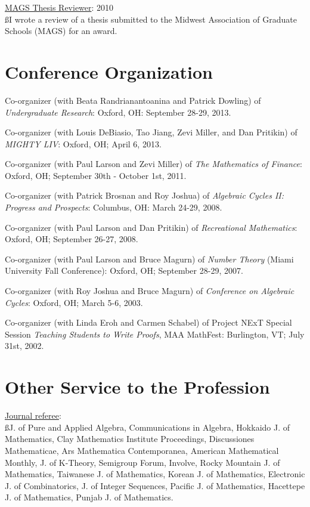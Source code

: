 \documentclass[overlapped,line,letterpaper]{res}
\begin{document}
\begin{resume}
\underline{MAGS Thesis Reviewer}: 2010 \\
{\ss I wrote a review of a thesis submitted to the Midwest Association of Graduate Schools (MAGS) for an award.}


\large
\section{\bf  Conference Organization}
\vspace{3mm}
\normalsize

Co-organizer (with Beata Randrianantoanina and Patrick Dowling) of {\em 
Undergraduate Research}: Oxford, OH: September 28-29, 2013.

Co-organizer (with Louis DeBiasio, Tao Jiang, Zevi Miller, and Dan Pritikin) of 
{\em MIGHTY LIV}: Oxford, OH; April 6, 2013.  

Co-organizer (with Paul Larson and Zevi Miller) of {\em The Mathematics of 
Finance}: Oxford, OH; September 30th - October 1st, 2011.

Co-organizer (with Patrick Brosnan and Roy Joshua) of {\em Algebraic
Cycles II: Progress and Prospects}: Columbus, OH: March 24-29, 2008.

Co-organizer (with Paul Larson and Dan Pritikin) of {\em
Recreational Mathematics}: Oxford, OH; September 26-27, 2008.

Co-organizer (with Paul Larson and Bruce Magurn) of {\em Number
Theory} (Miami University Fall Conference): Oxford, OH; September
28-29, 2007.

Co-organizer (with Roy Joshua and Bruce Magurn) of {\em Conference
on Algebraic Cycles}: Oxford, OH; March 5-6, 2003.

Co-organizer (with Linda Eroh and Carmen Schabel) of Project NExT
Special Session {\em Teaching Students to Write Proofs}, MAA
MathFest: Burlington, VT; July 31st, 2002.
	
\newpage	

\large
\section{\bf Other Service to the Profession}
\vspace{3mm}
\normalsize

\underline{Journal referee}: \\
{\ss J. of Pure and Applied Algebra, Communications in Algebra, Hokkaido J. of Mathematics, Clay Mathematics Institute Proceedings, 
Discussiones Mathematicae, Ars Mathematica Contemporanea, American Mathematical Monthly, J. of K-Theory, Semigroup Forum, Involve, Rocky 
Mountain J. of Mathematics, Taiwanese J. of Mathematics, Korean J. of Mathematics, Electronic J. of Combinatorics, J. of Integer Sequences, Pacific J. of Mathematics, Hacettepe J. of Mathematics, Punjab J. of Mathematics.}


\end{resume}
\end{document}
